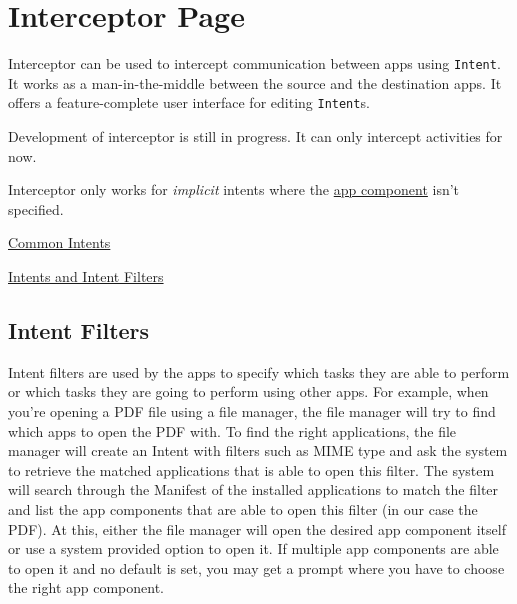\section{Interceptor Page}\label{sec:interceptor-page}
Interceptor can be used to intercept communication between apps using \texttt{Intent}. It works as a man-in-the-middle
between the source and the destination apps. It offers a feature-complete user interface for editing \texttt{Intent}s.

\begin{tip}[Info]
    Development of interceptor is still in progress. It can only intercept activities for now.
\end{tip}

\begin{warning}[Warning]
    Interceptor only works for \textit{implicit} intents where the \hyperref[subsec:faq:what-are-app-components]{app
    component} isn't specified.
\end{warning}

\begin{amseealso}
    \item \href{https://developer.android.com/guide/components/intents-common}{Common Intents}
    \item \href{https://developer.android.com/guide/components/intents-filters}{Intents and Intent Filters}
\end{amseealso}

\subsection{Intent Filters}\label{subsec:intent-filters}
Intent filters are used by the apps to specify which tasks they are able to perform or which tasks they are going to
perform using other apps. For example, when you're opening a PDF file using a file manager, the file manager will try
to find which apps to open the PDF with. To find the right applications, the file manager will create an Intent with
filters such as MIME type and ask the system to retrieve the matched applications that is able to open this filter.
The system will search through the Manifest of the installed applications to match the filter and list the app
components that are able to open this filter (in our case the PDF). At this, either the file manager will open the
desired app component itself or use a system provided option to open it. If multiple app components are able to open it
and no default is set, you may get a prompt where you have to choose the right app component.

